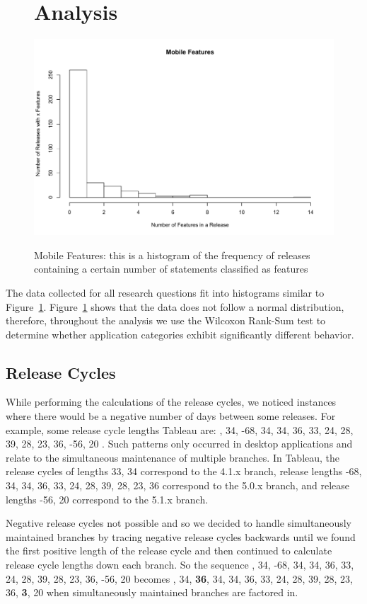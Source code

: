 \documentclass{acm_proc_article-sp}
\begin{document}
\begin{figure}


\section{Analysis}

\begin{center}
\includegraphics[width=.5\textwidth]{mobileFeaturesHist.pdf}
\label{fig:mobHist}
\caption{Mobile Features: this is a histogram of the frequency of releases containing a certain number of statements classified as features}
\end{center}
\end{figure}


The data collected for all research questions fit into histograms similar to Figure~\ref{fig:mobHist}. 
Figure~\ref{fig:mobHist} shows that the data does not follow a normal distribution, therefore, throughout the analysis we use the Wilcoxon Rank-Sum test to determine whether application categories exhibit significantly different behavior.


\subsection{Release Cycles}
While performing the calculations of the release cycles, we noticed instances where there would be a negative number of days between some releases.
For example, some release cycle lengths Tableau are: , 34, -68, 34, 34, 36, 33, 24, 28, 39, 28, 23, 36, -56, 20 \textellipsis\space . 
Such patterns only occurred in desktop applications and relate to the simultaneous maintenance of multiple branches. 
In Tableau, the release cycles of lengths 33, 34 correspond to the 4.1.x branch, release lengths -68, 34, 34, 36, 33, 24, 28, 39, 28, 23, 36 correspond to the 5.0.x branch, and release lengths -56, 20 correspond to the 5.1.x branch.



Negative release cycles not possible and so we decided to handle simultaneously maintained branches by tracing negative release cycles backwards until we found the first positive length of the release cycle and then continued to calculate release cycle lengths down each branch. 
So the sequence , 34, -68, 34, 34, 36, 33, 24, 28, 39, 28, 23, 36, -56, 20 \textellipsis becomes , 34, \textbf{36}, 34, 34, 36, 33, 24, 28, 39, 28, 23, 36, \textbf{3}, 20 \textellipsis when simultaneously maintained branches are factored in.
\end{document}
